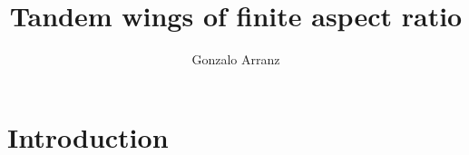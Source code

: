 \documentclass[a4paper]{article}
\author{Gonzalo Arranz}
\title{Tandem wings of finite aspect ratio}
\begin{document}
\maketitle

\section{Introduction}
\end{document}
